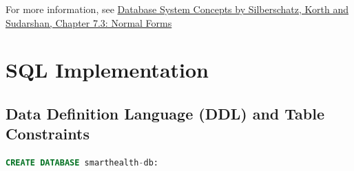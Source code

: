 \documentclass[12pt,a4paper]{article}
\begin{document}
For more information, see \href{https://www.db-book.com/}{Database System Concepts by Silberschatz, Korth and Sudarshan, Chapter 7.3: Normal Forms}

\section{SQL Implementation}
\subsection{Data Definition Language (DDL) and Table Constraints}

\begin{lstlisting}[language=SQL, caption=Creating Database, basicstyle=\ttfamily\footnotesize, breaklines=true]
CREATE DATABASE smarthealth-db:
\end{lstlisting}
\end{document}
